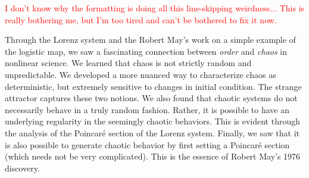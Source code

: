\documentclass[twocolumn,amsmath,amssymb,aps]{revtex4}
\begin{document}
\textcolor{red}{I don't know why the formatting is doing all this line-skipping weirdness... This is really bothering me, but I'm too tired and can't be bothered to fix it now.}


Through the Lorenz system and the Robert May's work on a simple example of the logistic map, we saw a fascinating connection between \textit{order} and \textit{chaos} in nonlinear science. We learned that chaos is not strictly random and unpredictable. We developed a more nuanced way to characterize chaos as deterministic, but extremely sensitive to changes in initial condition. The strange attractor captures these two notions. We also found that chaotic systems do not necessarily behave in a truly random fashion. Rather, it is possible to have an underlying regularity in the seemingly chaotic behaviors. This is evident through the analysis of the Poincar\'{e} section of the Lorenz system. Finally, we saw that it is also possible to generate chaotic behavior by first setting a Poincar\'{e} section (which needs not be very complicated). This is the essence of Robert May's 1976 discovery.



\end{document}
